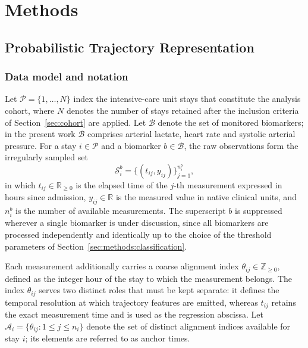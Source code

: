 
\section{Methods}
\label{sec:methods}

\subsection{Probabilistic Trajectory Representation}
\label{sec:methods:representation}

\subsubsection{Data model and notation}

Let $\mathcal{P}=\{1,\dots,N\}$ index the intensive-care unit stays that constitute the analysis cohort, where $N$ denotes the number of stays retained after the inclusion criteria of Section~\ref{sec:cohort} are applied. Let $\mathcal{B}$ denote the set of monitored biomarkers; in the present work $\mathcal{B}$ comprises arterial lactate, heart rate and systolic arterial pressure. For a stay $i\in\mathcal{P}$ and a biomarker $b\in\mathcal{B}$, the raw observations form the irregularly sampled set
$$\mathcal{S}_i^b=\{(t_{ij},y_{ij})\}_{j=1}^{n_i^b},$$
in which $t_{ij}\in\mathbb{R}_{\ge0}$ is the elapsed time of the $j$-th measurement expressed in hours since admission, $y_{ij}\in\mathbb{R}$ is the measured value in native clinical units, and $n_i^b$ is the number of available measurements. The superscript $b$ is suppressed wherever a single biomarker is under discussion, since all biomarkers are processed independently and identically up to the choice of the threshold parameters of Section~\ref{sec:methods:classification}.

Each measurement additionally carries a coarse alignment index $\theta_{ij}\in\mathbb{Z}_{\ge0}$, defined as the integer hour of the stay to which the measurement belongs. The index $\theta_{ij}$ serves two distinct roles that must be kept separate: it defines the temporal resolution at which trajectory features are emitted, whereas $t_{ij}$ retains the exact measurement time and is used as the regression abscissa. Let $\mathcal{A}_i=\{\theta_{ij}:1\le j\le n_i\}$ denote the set of distinct alignment indices available for stay $i$; its elements are referred to as anchor times.

